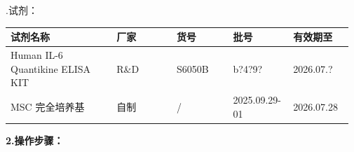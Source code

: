 \documentclass[UTF8,10pt,a4paper,fontset=fandol]{ctexart}
\newcommand{\fieldvalue}[1]{#1}
\newcommand{\handwritten}[1]{#1}
\begin{document}
.\quad 试剂：

\begin{center}
\begin{tabular}{|p{0.30\linewidth}|p{0.17\linewidth}|p{0.16\linewidth}|p{0.17\linewidth}|p{0.17\linewidth}|}
\hline
试剂名称 & 厂家 & 货号 & 批号 & 有效期至\\
\hline
Human IL-6 Quantikine ELISA KIT & R\&D & S6050B &
\fieldvalue{\handwritten{b?4?9?}} &
\fieldvalue{\handwritten{2026.07.?}}\\
\hline
MSC 完全培养基 & 自制 & / &
\fieldvalue{\handwritten{2025.09.29-01}} &
\fieldvalue{\handwritten{2026.07.28}}\\
\hline
\end{tabular}
\end{center}

\noindent\textbf{2.\quad 操作步骤：}
\end{document}
